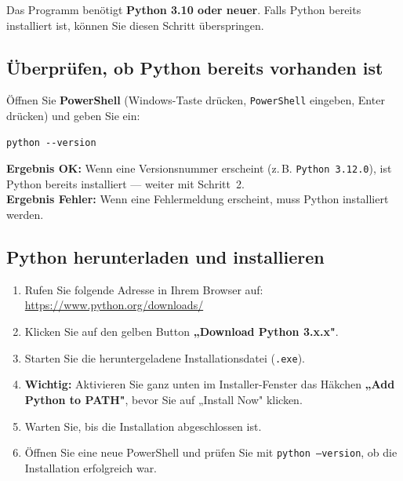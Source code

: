 \documentclass[a4paper,11pt]{article}
\newenvironment{hinweisbox}{%
  \begin{mdframed}[backgroundcolor=hinweis,linecolor=hinweisrand,linewidth=1pt,
    innerleftmargin=8pt,innerrightmargin=8pt,innertopmargin=6pt,innerbottommargin=6pt]
  \small}{%
  \end{mdframed}}
\begin{document}
Das Programm benötigt \textbf{Python 3.10 oder neuer}. Falls Python bereits
installiert ist, können Sie diesen Schritt überspringen.

\subsection{Überprüfen, ob Python bereits vorhanden ist}

Öffnen Sie \textbf{PowerShell} (Windows-Taste drücken, \texttt{PowerShell}
eingeben, Enter drücken) und geben Sie ein:

\begin{lstlisting}
python --version
\end{lstlisting}

\begin{hinweisbox}
\textbf{Ergebnis OK:} Wenn eine Versionsnummer erscheint (z.\,B.
\texttt{Python 3.12.0}), ist Python bereits installiert — weiter mit Schritt~2.\\[4pt]
\textbf{Ergebnis Fehler:} Wenn eine Fehlermeldung erscheint, muss Python
installiert werden.
\end{hinweisbox}

\subsection{Python herunterladen und installieren}

\begin{enumerate}[leftmargin=1.5em, itemsep=4pt]
  \item Rufen Sie folgende Adresse in Ihrem Browser auf:\\
        \url{https://www.python.org/downloads/}
  \item Klicken Sie auf den gelben Button \textbf{„Download Python 3.x.x"}.
  \item Starten Sie die heruntergeladene Installationsdatei (\texttt{.exe}).
  \item \textbf{Wichtig:} Aktivieren Sie ganz unten im Installer-Fenster das
        Häkchen \textbf{„Add Python to PATH"}, bevor Sie auf „Install Now" klicken.
  \item Warten Sie, bis die Installation abgeschlossen ist.
  \item Öffnen Sie eine neue PowerShell und prüfen Sie mit \texttt{python --version},
        ob die Installation erfolgreich war.
\end{enumerate}

\end{document}
